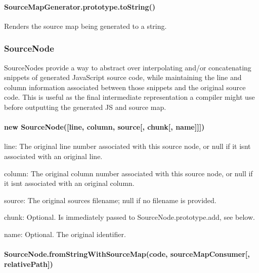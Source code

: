 \paragraph*{Source\+Map\+Generator.\+prototype.\+to\+String()}

Renders the source map being generated to a string.

\subsubsection*{Source\+Node}

Source\+Nodes provide a way to abstract over interpolating and/or concatenating snippets of generated Java\+Script source code, while maintaining the line and column information associated between those snippets and the original source code. This is useful as the final intermediate representation a compiler might use before outputting the generated JS and source map.

\paragraph*{new Source\+Node(\mbox{[}line, column, source\mbox{[}, chunk\mbox{[}, name\mbox{]}\mbox{]}\mbox{]})}


\begin{DoxyItemize}
\item {\ttfamily line}\+: The original line number associated with this source node, or null if it isn\textquotesingle{}t associated with an original line.
\item {\ttfamily column}\+: The original column number associated with this source node, or null if it isn\textquotesingle{}t associated with an original column.
\item {\ttfamily source}\+: The original source\textquotesingle{}s filename; null if no filename is provided.
\item {\ttfamily chunk}\+: Optional. Is immediately passed to {\ttfamily Source\+Node.\+prototype.\+add}, see below.
\item {\ttfamily name}\+: Optional. The original identifier.
\end{DoxyItemize}

\paragraph*{Source\+Node.\+from\+String\+With\+Source\+Map(code, source\+Map\+Consumer\mbox{[}, relative\+Path\mbox{]})}

